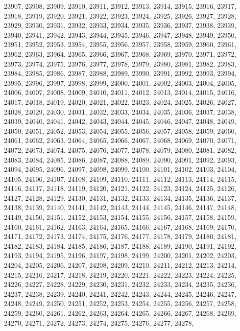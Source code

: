 23907,
23908,
23909,
23910,
23911,
23912,
23913,
23914,
23915,
23916,
23917,
23918,
23919,
23920,
23921,
23922,
23923,
23924,
23925,
23926,
23927,
23928,
23929,
23930,
23931,
23932,
23933,
23934,
23935,
23936,
23937,
23938,
23939,
23940,
23941,
23942,
23943,
23944,
23945,
23946,
23947,
23948,
23949,
23950,
23951,
23952,
23953,
23954,
23955,
23956,
23957,
23958,
23959,
23960,
23961,
23962,
23963,
23964,
23965,
23966,
23967,
23968,
23969,
23970,
23971,
23972,
23973,
23974,
23975,
23976,
23977,
23978,
23979,
23980,
23981,
23982,
23983,
23984,
23985,
23986,
23987,
23988,
23989,
23990,
23991,
23992,
23993,
23994,
23995,
23996,
23997,
23998,
23999,
24000,
24001,
24002,
24003,
24004,
24005,
24006,
24007,
24008,
24009,
24010,
24011,
24012,
24013,
24014,
24015,
24016,
24017,
24018,
24019,
24020,
24021,
24022,
24023,
24024,
24025,
24026,
24027,
24028,
24029,
24030,
24031,
24032,
24033,
24034,
24035,
24036,
24037,
24038,
24039,
24040,
24041,
24042,
24043,
24044,
24045,
24046,
24047,
24048,
24049,
24050,
24051,
24052,
24053,
24054,
24055,
24056,
24057,
24058,
24059,
24060,
24061,
24062,
24063,
24064,
24065,
24066,
24067,
24068,
24069,
24070,
24071,
24072,
24073,
24074,
24075,
24076,
24077,
24078,
24079,
24080,
24081,
24082,
24083,
24084,
24085,
24086,
24087,
24088,
24089,
24090,
24091,
24092,
24093,
24094,
24095,
24096,
24097,
24098,
24099,
24100,
24101,
24102,
24103,
24104,
24105,
24106,
24107,
24108,
24109,
24110,
24111,
24112,
24113,
24114,
24115,
24116,
24117,
24118,
24119,
24120,
24121,
24122,
24123,
24124,
24125,
24126,
24127,
24128,
24129,
24130,
24131,
24132,
24133,
24134,
24135,
24136,
24137,
24138,
24139,
24140,
24141,
24142,
24143,
24144,
24145,
24146,
24147,
24148,
24149,
24150,
24151,
24152,
24153,
24154,
24155,
24156,
24157,
24158,
24159,
24160,
24161,
24162,
24163,
24164,
24165,
24166,
24167,
24168,
24169,
24170,
24171,
24172,
24173,
24174,
24175,
24176,
24177,
24178,
24179,
24180,
24181,
24182,
24183,
24184,
24185,
24186,
24187,
24188,
24189,
24190,
24191,
24192,
24193,
24194,
24195,
24196,
24197,
24198,
24199,
24200,
24201,
24202,
24203,
24204,
24205,
24206,
24207,
24208,
24209,
24210,
24211,
24212,
24213,
24214,
24215,
24216,
24217,
24218,
24219,
24220,
24221,
24222,
24223,
24224,
24225,
24226,
24227,
24228,
24229,
24230,
24231,
24232,
24233,
24234,
24235,
24236,
24237,
24238,
24239,
24240,
24241,
24242,
24243,
24244,
24245,
24246,
24247,
24248,
24249,
24250,
24251,
24252,
24253,
24254,
24255,
24256,
24257,
24258,
24259,
24260,
24261,
24262,
24263,
24264,
24265,
24266,
24267,
24268,
24269,
24270,
24271,
24272,
24273,
24274,
24275,
24276,
24277,
24278,
